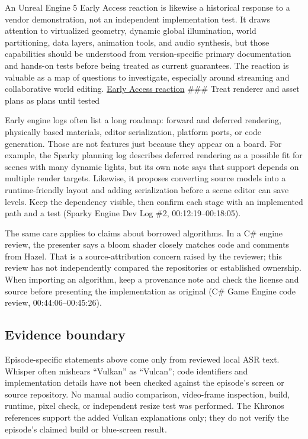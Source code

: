 An Unreal Engine 5 Early Access reaction is likewise a historical response to a vendor demonstration, not an independent implementation test. It draws attention to virtualized geometry, dynamic global illumination, world partitioning, data layers, animation tools, and audio synthesis, but those capabilities should be understood from version-specific primary documentation and hands-on tests before being treated as current guarantees. The reaction is valuable as a map of questions to investigate, especially around streaming and collaborative world editing. \href{https://www.youtube.com/watch?v=nyZnRxvSJrY&t=4m40s}{Early Access reaction} \#\#\# Treat renderer and asset plans as plans until tested

Early engine logs often list a long roadmap: forward and deferred rendering, physically based materials, editor serialization, platform ports, or code generation. Those are not features just because they appear on a board. For example, the Sparky planning log describes deferred rendering as a possible fit for scenes with many dynamic lights, but its own note says that support depends on multiple render targets. Likewise, it proposes converting source models into a runtime-friendly layout and adding serialization before a scene editor can save levels. Keep the dependency visible, then confirm each stage with an implemented path and a test (Sparky Engine Dev Log \#2, 00:12:19--00:18:05).

The same care applies to claims about borrowed algorithms. In a C\# engine review, the presenter says a bloom shader closely matches code and comments from Hazel. That is a source-attribution concern raised by the reviewer; this review has not independently compared the repositories or established ownership. When importing an algorithm, keep a provenance note and check the license and source before presenting the implementation as original (C\# Game Engine code review, 00:44:06--00:45:26).

\subsection{Evidence boundary}\label{05-engine-i-ch008-evidence-boundary}

Episode-specific statements above come only from reviewed local ASR text. Whisper often mishears ``Vulkan'' as ``Vulcan''; code identifiers and implementation details have not been checked against the episode's screen or source repository. No manual audio comparison, video-frame inspection, build, runtime, pixel check, or independent resize test was performed. The Khronos references support the added Vulkan explanations only; they do not verify the episode's claimed build or blue-screen result.


